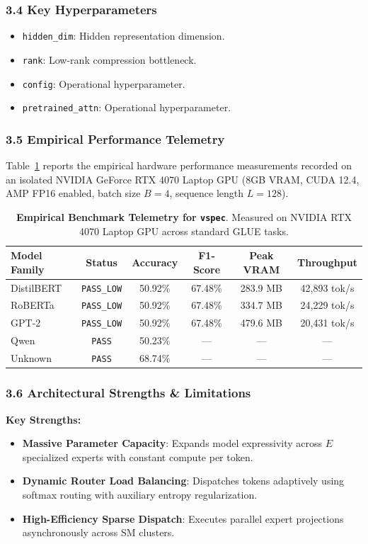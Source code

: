\subsubsection*{3.4 Key Hyperparameters}
\begin{itemize}
    \item \texttt{hidden\_dim}: Hidden representation dimension.
    \item \texttt{rank}: Low-rank compression bottleneck.
    \item \texttt{config}: Operational hyperparameter.
    \item \texttt{pretrained\_attn}: Operational hyperparameter.
\end{itemize}

\subsubsection*{3.5 Empirical Performance Telemetry}
Table~\ref{tab:telemetry_vspec} reports the empirical hardware performance measurements recorded on an isolated NVIDIA GeForce RTX 4070 Laptop GPU (8GB VRAM, CUDA 12.4, AMP FP16 enabled, batch size $B=4$, sequence length $L=128$).

\begin{table}[h]
\centering
\small
\caption{\textbf{Empirical Benchmark Telemetry for \texttt{vspec}}. Measured on NVIDIA RTX 4070 Laptop GPU across standard GLUE tasks.}
\label{tab:telemetry_vspec}
\begin{tabular*}{\columnwidth}{@{\extracolsep{\fill}}lccccc}
\toprule
\textbf{Model Family} & \textbf{Status} & \textbf{Accuracy} & \textbf{F1-Score} & \textbf{Peak VRAM} & \textbf{Throughput} \\
\midrule
DistilBERT & \texttt{PASS\_LOW} & 50.92\% & 67.48\% & 283.9 MB & 42,893 tok/s \\
RoBERTa & \texttt{PASS\_LOW} & 50.92\% & 67.48\% & 334.7 MB & 24,229 tok/s \\
GPT-2 & \texttt{PASS\_LOW} & 50.92\% & 67.48\% & 479.6 MB & 20,431 tok/s \\
Qwen & \texttt{PASS} & 50.23\% & --- & --- & --- \\
Unknown & \texttt{PASS} & 68.74\% & --- & --- & --- \\
\bottomrule
\end{tabular*}
\end{table}

\subsubsection*{3.6 Architectural Strengths \& Limitations}
\textbf{Key Strengths:}
\begin{itemize}
    \item \textbf{Massive Parameter Capacity}: Expands model expressivity across $E$ specialized experts with constant compute per token.
    \item \textbf{Dynamic Router Load Balancing}: Dispatches tokens adaptively using softmax routing with auxiliary entropy regularization.
    \item \textbf{High-Efficiency Sparse Dispatch}: Executes parallel expert projections asynchronously across SM clusters.
\end{itemize}

